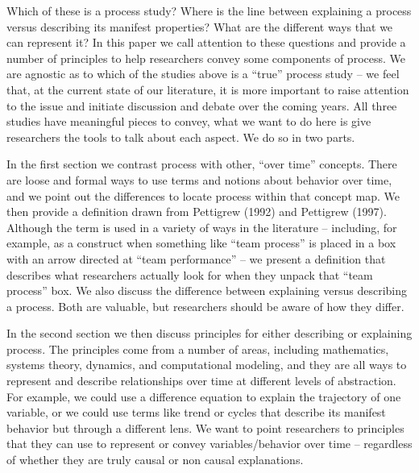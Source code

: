 \documentclass[english,,man]{apa6}
\theoremstyle{definition}
\theoremstyle{definition}
\theoremstyle{definition}
\theoremstyle{remark}
\begin{document}
Which of these is a process study? Where is the line between explaining
a process versus describing its manifest properties? What are the
different ways that we can represent it? In this paper we call attention
to these questions and provide a number of principles to help
researchers convey some components of process. We are agnostic as to
which of the studies above is a \enquote{true} process study -- we feel
that, at the current state of our literature, it is more important to
raise attention to the issue and initiate discussion and debate over the
coming years. All three studies have meaningful pieces to convey, what
we want to do here is give researchers the tools to talk about each
aspect. We do so in two parts.

In the first section we contrast process with other, \enquote{over time}
concepts. There are loose and formal ways to use terms and notions about
behavior over time, and we point out the differences to locate process
within that concept map. We then provide a definition drawn from
Pettigrew (1992) and Pettigrew (1997). Although the term is used in a
variety of ways in the literature -- including, for example, as a
construct when something like \enquote{team process} is placed in a box
with an arrow directed at \enquote{team performance} -- we present a
definition that describes what researchers actually look for when they
unpack that \enquote{team process} box. We also discuss the difference
between explaining versus describing a process. Both are valuable, but
researchers should be aware of how they differ.

In the second section we then discuss principles for either describing
or explaining process. The principles come from a number of areas,
including mathematics, systems theory, dynamics, and computational
modeling, and they are all ways to represent and describe relationships
over time at different levels of abstraction. For example, we could use
a difference equation to explain the trajectory of one variable, or we
could use terms like trend or cycles that describe its manifest behavior
but through a different lens. We want to point researchers to principles
that they can use to represent or convey variables/behavior over time --
regardless of whether they are truly causal or non causal explanations.
\end{document}
